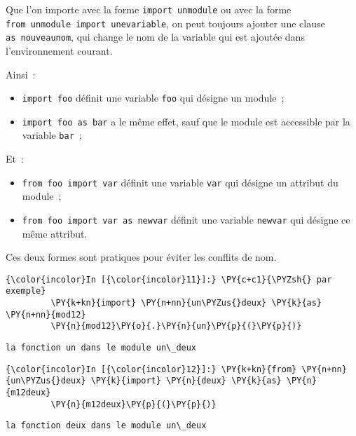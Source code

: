    Que l'on importe avec la forme \texttt{import\ unmodule} ou avec la
forme \texttt{from\ unmodule\ import\ unevariable}, on peut toujours
ajouter une clause \texttt{as\ nouveaunom}, qui change le nom de la
variable qui est ajoutée dans l'environnement courant.

    Ainsi~:

\begin{itemize}
\tightlist
\item
  \texttt{import\ foo} définit une variable \texttt{foo} qui désigne un
  module~;
\item
  \texttt{import\ foo\ as\ bar} a le même effet, sauf que le module est
  accessible par la variable \texttt{bar}~;
\end{itemize}

    Et~:

\begin{itemize}
\tightlist
\item
  \texttt{from\ foo\ import\ var} définit une variable \texttt{var} qui
  désigne un attribut du module~;
\item
  \texttt{from\ foo\ import\ var\ as\ newvar} définit une variable
  \texttt{newvar} qui désigne ce même attribut.
\end{itemize}

    Ces deux formes sont pratiques pour éviter les conflits de nom.

    \begin{Verbatim}[commandchars=\\\{\}]
{\color{incolor}In [{\color{incolor}11}]:} \PY{c+c1}{\PYZsh{} par exemple}
         \PY{k+kn}{import} \PY{n+nn}{un\PYZus{}deux} \PY{k}{as} \PY{n+nn}{mod12}
         \PY{n}{mod12}\PY{o}{.}\PY{n}{un}\PY{p}{(}\PY{p}{)}
\end{Verbatim}


    \begin{Verbatim}[commandchars=\\\{\}]
la fonction un dans le module un\_deux

    \end{Verbatim}

    \begin{Verbatim}[commandchars=\\\{\}]
{\color{incolor}In [{\color{incolor}12}]:} \PY{k+kn}{from} \PY{n+nn}{un\PYZus{}deux} \PY{k}{import} \PY{n}{deux} \PY{k}{as} \PY{n}{m12deux}
         \PY{n}{m12deux}\PY{p}{(}\PY{p}{)}
\end{Verbatim}


    \begin{Verbatim}[commandchars=\\\{\}]
la fonction deux dans le module un\_deux

    \end{Verbatim}

